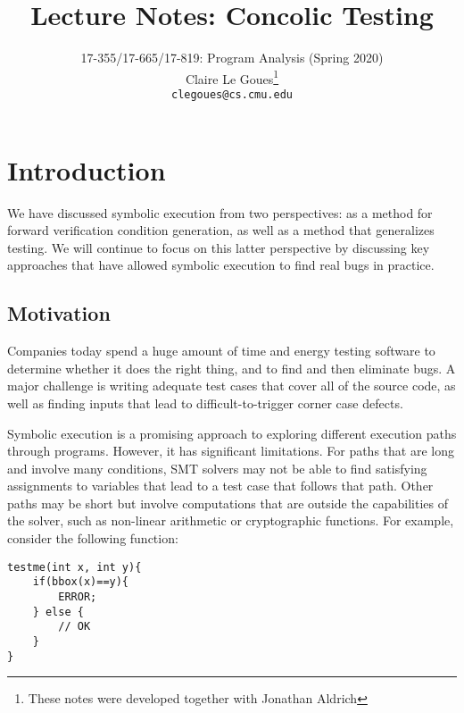 \documentclass[11pt]{article}
\title{Lecture Notes: Concolic Testing}
\author{17-355/17-665/17-819: Program Analysis (Spring 2020)\\
        Claire Le Goues\footnote{These notes were developed together with
          Jonathan Aldrich}\\
		{\tt clegoues@cs.cmu.edu}}
\date{}
\begin{document}
\maketitle



\section{Introduction}

We have discussed symbolic execution from two perspectives: as a method for
forward verification condition generation, as well as a method that generalizes
testing.  We will continue to focus on this latter perspective by discussing key 
approaches that have allowed symbolic execution to find real bugs in practice. 

\subsection{Motivation}

Companies today spend a huge amount of time and energy testing software to
determine whether it does the right thing, and to find and then eliminate bugs.
A major challenge is writing adequate test cases that cover all of the source
code, as well as finding inputs that lead to difficult-to-trigger corner case
defects.

Symbolic execution is a promising approach to exploring different execution
paths through programs. However, it has significant limitations. For paths that
are long and involve many conditions, SMT solvers may not be able to find
satisfying assignments to variables that lead to a test case that follows that
path. Other paths may be short but involve computations that are outside the
capabilities of the solver, such as non-linear arithmetic or cryptographic
functions. For example, consider the following function:

\begin{lstlisting}
testme(int x, int y){
	if(bbox(x)==y){
		ERROR;
	} else {
		// OK
	} 	
}
\end{lstlisting}
\end{document}
